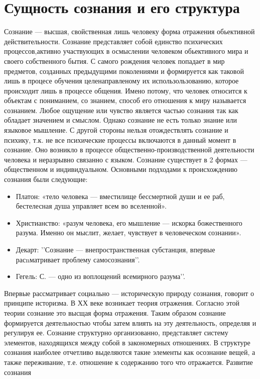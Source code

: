 \documentclass[12pt]{article}
\begin{document}
\section{Сущность сознания и его структура}
Сознание — высшая, свойственная лишь человеку форма отражения обьективной действительности. Сознание
представляет  собой  единство  психических  процессов,активно  участвующих  в  осмыслении  человеком
обьективного  мира  и  своего  собственного  бытия.  С  самого  рождения  человек  попадает  в  мир  предметов,
созданных предыдущими поколениями и формируется как таковой лишь в процесе обучения целенаправленому
их использользованию, которое происходит лишь в процессе общения. Имено потому, что человек относится к
объектам с пониманием, со знанием, способ его отношения к миру называется сознанием. Любое ощущение
или чувство является частью сознания так как обладает значением и смыслом. Однако сознание не есть только
знание  или  языковое  мышление.  С  другой  стороны  нельзя  отождествлять  сознание  и  психику,  т.к.  не  все
психические  процессы  включаются  в  данный  момент  в  сознание.  Оно  возникло  в  процессе  общественно-производственной деятельности человека и неразрывно связанно с языком. Сознание существует в 2 формах —
общественном  и  индивидуальном.  Основными  подходами  к  происхождению  сознания  были  следующие:
\begin{itemize}
\item Платон: «тело  человека  — вместилище  бессмертной  души и ее  раб,  бестелесная душа управляет всем  во
вселенной».
\item Христианство:  «разум  человека,  его  мышление  —  искорка  божественного  разума.  Именно  он
мыслит, желает, чувствует в человеческом сознании».
\item Декарт: ’’Сознание — внепространственная субстанция,
впервые  расnматривает  проблему  самосознания’’.
\item Гегель:  С.  —  одно  из  воплощений  всемирного  разума’’.
\end{itemize}
Впервые рассматривает социально — историческую природу сознания, говорит о принципе историзма. В ХХ
веке возникает теория отражения. Согласно этой теории сознание это высщая форма отражения. Таким образом
сознание формируется деятельностью чтобы затем влиять на эту деятельность, определяя и регулируя ее.
Сознание  структурно  организованно,  представляет  систему  элементов,  находящихся  между  собой  в
закономерных  отношениях.  В  структуре  сознания  наиболее  отчетливо  выделяются  такие  элементы  как
осознание вещей, а также переживание, т.е. отношение к содержанию того что отражается. Развитие сознания
\end{document}
